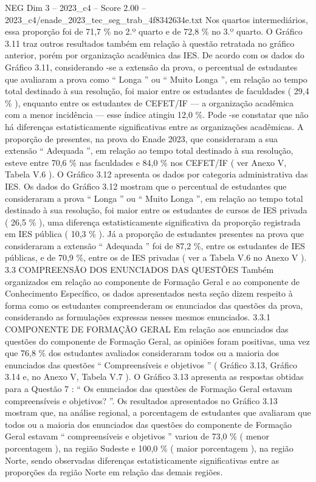 \begin{textsample}{NEG Dim 3 – 2023\_c4 – Score 2.00 – 2023\_c4/enade\_2023\_tec\_seg\_trab\_4f8342634e.txt}
Nos quartos intermediários, essa proporção foi de 71,7 \% no 2.º quarto e de 72,8 \% no 3.º quarto.
O Gráfico 3.11 traz outros resultados também em relação à questão retratada no gráfico anterior, porém por organização acadêmica das IES.
De acordo com os dados do Gráfico 3.11, considerando -se a extensão da prova, o percentual de estudantes que avaliaram a prova como “ Longa ” ou “ Muito Longa ”, em relação ao tempo total destinado à sua resolução, foi maior entre os estudantes de faculdades ( 29,4 \% ), enquanto entre os estudantes de CEFET/IF — a organização acadêmica com a menor incidência — esse índice atingiu 12,0 \%.
Pode -se constatar que não há diferenças estatisticamente significativas entre as organizações acadêmicas.
A proporção de presentes, na prova do Enade 2023, que consideraram a sua extensão “ Adequada ”, em relação ao tempo total destinado à sua resolução, esteve entre 70,6 \% nas faculdades e 84,0 \% nos CEFET/IF ( ver Anexo V, Tabela V.6 ).
O Gráfico 3.12 apresenta os dados por categoria administrativa das IES.
Os dados do Gráfico 3.12 mostram que o percentual de estudantes que consideraram a prova “ Longa ” ou “ Muito Longa ”, em relação ao tempo total destinado à sua resolução, foi maior entre os estudantes de cursos de IES privada ( 26,5 \% ), uma diferença estatisticamente significativa da proporção registrada em IES pública ( 10,3 \% ).
Já a proporção de estudantes presentes na prova que consideraram a extensão “ Adequada ” foi de 87,2 \%, entre os estudantes de IES públicas, e de 70,9 \%, entre os de IES privadas ( ver a Tabela V.6 no Anexo V ). 3.3 COMPREENSÃO DOS ENUNCIADOS DAS QUESTÕES Também organizados em relação ao componente de Formação Geral e ao componente de Conhecimento Específico, os dados apresentados nesta seção dizem respeito à forma como os estudantes compreenderam os enunciados das questões da prova, considerando as formulações expressas nesses mesmos enunciados. 3.3.1 COMPONENTE DE FORMAÇÃO GERAL Em relação aos enunciados das questões do componente de Formação Geral, as opiniões foram positivas, uma vez que 76,8 \% dos estudantes avaliados consideraram todos ou a maioria dos enunciados das questões “ Compreensíveis e objetivos ” ( Gráfico 3.13, Gráfico 3.14 e, no Anexo V, Tabela V.7 ).
O Gráfico 3.13 apresenta as respostas obtidas para a Questão 7 : “ Os enunciados das questões de Formação Geral estavam compreensíveis e objetivos? ”.
Os resultados apresentados no Gráfico 3.13 mostram que, na análise regional, a porcentagem de estudantes que avaliaram que todos ou a maioria dos enunciados das questões do componente de Formação Geral estavam “ compreensíveis e objetivos ” variou de 73,0 \% ( menor porcentagem ), na região Sudeste e 100,0 \% ( maior porcentagem ), na região Norte, sendo observadas diferenças estatisticamente significativas entre as proporções da região Norte em relação das demais regiões.

\end{textsample}

